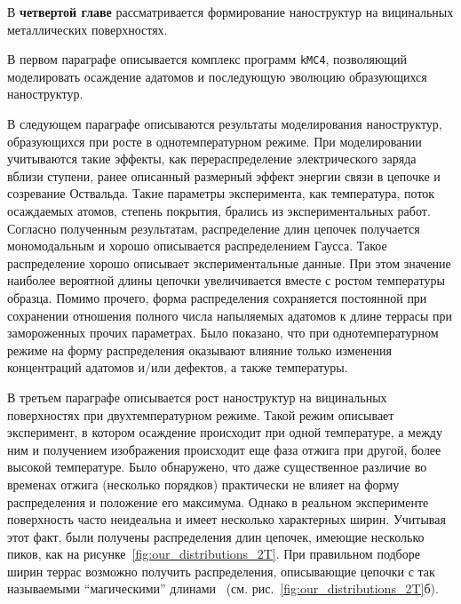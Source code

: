 \documentclass[10pt]{book}
\begin{document}
В \textbf{четвертой главе} рассматривается формирование наноструктур на вицинальных металлических поверхностях.

В первом параграфе описывается комплекс программ \texttt{kMC4}, позволяющий моделировать осаждение адатомов и последующую эволюцию образующихся наноструктур.

В следующем параграфе описываются результаты моделирования наноструктур, образующихся при росте в однотемпературном режиме. При моделировании учитываются такие эффекты, как перераспределение электрического заряда вблизи ступени, ранее описанный размерный эффект энергии связи в цепочке и созревание Оствальда. Такие параметры эксперимента, как температура, поток осаждаемых атомов, степень покрытия, брались из экспериментальных работ. Согласно полученным результатам, распределение длин цепочек получается мономодальным и хорошо описывается распределением Гаусса. Такое распределение хорошо описывает экспериментальные данные. При этом значение наиболее вероятной длины цепочки увеличивается вместе с ростом температуры образца. Помимо прочего, форма распределения сохраняется постоянной при сохранении отношения полного числа напыляемых адатомов к длине террасы при замороженных прочих параметрах.
Было показано, что при однотемпературном режиме на форму распределения оказывают влияние только изменения концентраций адатомов и/или дефектов, а также температуры.

В третьем параграфе описывается рост наноструктур на вицинальных поверхностях при двухтемпературном режиме. Такой режим описывает эксперимент, в котором осаждение происходит при одной температуре, а между ним и получением изображения происходит еще фаза отжига при другой, более высокой температуре.
Было обнаружено, что даже существенное различие во временах отжига (несколько порядков) практически не влияет на форму распределения и положение его максимума. Однако в реальном эксперименте поверхность часто неидеальна и имеет несколько характерных ширин. Учитывая этот факт, были получены распределения длин цепочек, имеющие несколько пиков, как на рисунке~\ref{fig:our_distributions_2T}. При правильном подборе ширин террас возможно получить распределения, описывающие цепочки с так называемыми ``магическими'' длинами~\cite{Mocking2013} (см. рис.~\ref{fig:our_distributions_2T}б).
\end{document}
